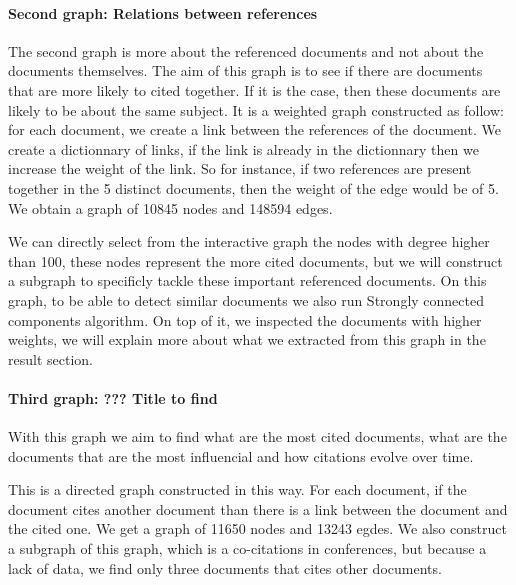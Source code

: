 \documentclass[journal,twocolumn]{IEEEtran}
\begin{document}
    \hypertarget{second-graph-relations-between-references}{%
\paragraph{Second graph: Relations between
references}\label{second-graph-relations-between-references}}

The second graph is more about the referenced documents and not about
the documents themselves. The aim of this graph is to see if there are
documents that are more likely to cited together. If it is the case,
then these documents are likely to be about the same subject. It is a
weighted graph constructed as follow: for each document, we create a
link between the references of the document. We create a dictionnary of
links, if the link is already in the dictionnary then we increase the
weight of the link. So for instance, if two references are present
together in the 5 distinct documents, then the weight of the edge would
be of 5. We obtain a graph of 10845 nodes and 148594 edges.



    We can directly select from the interactive graph the nodes with degree
higher than 100, these nodes represent the more cited documents, but we
will construct a subgraph to specificly tackle these important
referenced documents. On this graph, to be able to detect similar
documents we also run Strongly connected components algorithm. On top of
it, we inspected the documents with higher weights, we will explain more
about what we extracted from this graph in the result section.

    \hypertarget{third-graph-title-to-find}{%
\paragraph{Third graph: ??? Title to
find}\label{third-graph-title-to-find}}

With this graph we aim to find what are the most cited documents, what
are the documents that are the most influencial and how citations evolve
over time.

This is a directed graph constructed in this way. For each document, if
the document cites another document than there is a link between the
document and the cited one. We get a graph of 11650 nodes and 13243
egdes. We also construct a subgraph of this graph, which is a
co-citations in conferences, but because a lack of data, we find only
three documents that cites other documents.
\end{document}
